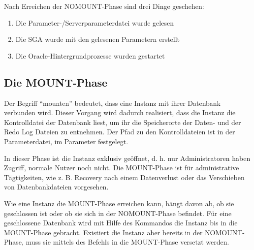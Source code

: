 
        Nach Erreichen der NOMOUNT-Phase sind drei Dinge geschehen:
        \begin{enumerate}
          \item Die Parameter-/Serverparameterdatei wurde gelesen
          \item Die SGA wurde mit den gelesenen Parametern erstellt
          \item Die Oracle-Hintergrundprozesse wurden gestartet
        \end{enumerate}
      \subsection{Die MOUNT-Phase}
        Der Begriff \enquote{mounten} bedeutet, dass eine Instanz mit ihrer Datenbank verbunden wird. Dieser Vorgang wird dadurch realisiert, dass die Instanz die Kontrolldatei der Datenbank liest, um ihr die Speicherorte der Daten- und der Redo Log Dateien zu entnehmen. Der Pfad zu den Kontrolldateien ist in der Parameterdatei, im Parameter  festgelegt.

        In dieser Phase ist die Instanz exklusiv geöffnet, d. h. nur Administratoren haben Zugriff, normale Nutzer noch nicht. Die MOUNT-Phase ist für administrative Tägtigkeiten, wie z. B. Recovery nach einem Datenverlust oder das Verschieben von Datenbankdateien vorgesehen.

        Wie eine Instanz die MOUNT-Phase erreichen kann, hängt davon ab, ob sie geschlossen ist oder ob sie sich in der NOMOUNT-Phase befindet. Für eine geschlossene Datenbank wird mit Hilfe des Kommandos  die Instanz bis in die MOUNT-Phase gebracht. Existiert die Instanz aber bereits in der NOMOUNT-Phase, muss sie mittels des Befehls  in die MOUNT-Phase versetzt werden.

